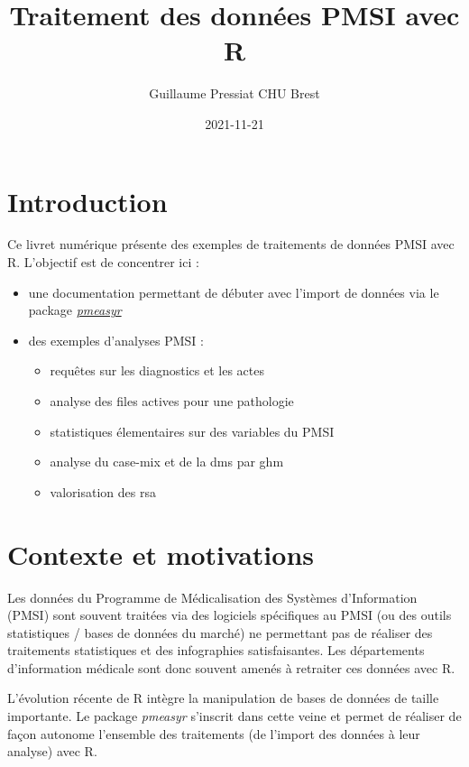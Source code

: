 \documentclass[
]{book}
\title{Traitement des données PMSI avec R}
\author{Guillaume Pressiat \textbar\textbar{} CHU Brest}
\date{2021-11-21}
\providecommand{\tightlist}{%
  \setlength{\itemsep}{0pt}\setlength{\parskip}{0pt}}
\begin{document}
\maketitle

{
\setcounter{tocdepth}{1}
\tableofcontents
}
\hypertarget{introduction}{%
\chapter{Introduction}\label{introduction}}

Ce livret numérique présente des exemples de traitements de données PMSI avec R. L'objectif est de concentrer ici :

\begin{itemize}
\item
  une documentation permettant de débuter avec l'import de données via le package \href{https://github.com/GuillaumePressiat/pmeasyr}{\emph{pmeasyr}}
\item
  des exemples d'analyses PMSI :

  \begin{itemize}
  \tightlist
  \item
    requêtes sur les diagnostics et les actes
  \item
    analyse des files actives pour une pathologie
  \item
    statistiques élementaires sur des variables du PMSI
  \item
    analyse du case-mix et de la dms par ghm
  \item
    valorisation des rsa
  \end{itemize}
\end{itemize}

\hypertarget{contexte}{%
\chapter{Contexte et motivations}\label{contexte}}

Les données du Programme de Médicalisation des Systèmes d'Information (PMSI) sont souvent traitées via des logiciels spécifiques au PMSI (ou des outils statistiques / bases de données du marché) ne permettant pas de réaliser des traitements statistiques et des infographies satisfaisantes. Les départements d'information médicale sont donc souvent amenés à retraiter ces données avec R.

L'évolution récente de R intègre la manipulation de bases de données de taille importante. Le package \emph{pmeasyr} s'inscrit dans cette veine et permet de réaliser de façon autonome l'ensemble des traitements (de l'import des données à leur analyse) avec R.
\end{document}
